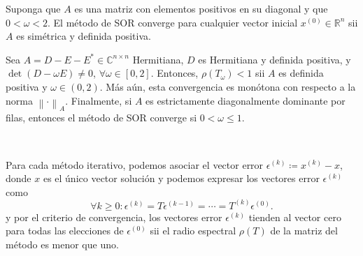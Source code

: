 \begin{frame}

	\begin{theorem}
		Suponga que $A$ es una matriz con elementos positivos en su
		diagonal y que $0<\omega<2$.
		El método de SOR converge para cualquier vector inicial
		$x^{\left(0\right)}\in\mathbb{R}^{n}$ sii $A$ es simétrica y
		definida positiva.
	\end{theorem}

	\begin{theorem}
		Sea $A=D-E-E^{\ast}\in\mathbb{C}^{n\times n}$ Hermitiana,
		$D$ es Hermitiana y definida positiva, y
		$\det\left(D-\omega E\right)\neq0$,
		$\forall\omega\in\left[0,2\right]$.
		Entonces, $\rho\left(T_{\omega}\right)<1$ sii $A$ es definida
		positiva y $\omega\in\left(0,2\right)$.
		Más aún, esta convergencia es monótona con respecto a la norma
		${\left\|\cdot\right\|}_{A}$.
		Finalmente, si $A$ es estrictamente diagonalmente dominante por
		filas, entonces el \alert{método de SOR} converge si
		$0<\omega\leq1$.
	\end{theorem}

	\

	Para cada método iterativo, podemos asociar el vector error
	\begin{math}
		\epsilon^{\left(k\right)}\coloneqq
		x^{\left(k\right)}-x
	\end{math},
	donde $x$ es el único vector solución y podemos expresar los
	vectores error $\epsilon^{\left(k\right)}$ como
	\begin{equation*}
		\forall k\geq0:
		\epsilon^{\left(k\right)}=
		T\epsilon^{\left(k-1\right)}=
		\cdots=
		T^{\left(k\right)}\epsilon^{\left(0\right)}.
	\end{equation*}
	y por el \alert{criterio de convergencia}, los vectores error
	$\epsilon^{\left(k\right)}$ tienden al vector cero para todas las
	elecciones de $\epsilon^{\left(0\right)}$ sii el radio espectral
	$\rho\left(T\right)$ de la matriz del método es menor que uno.
\end{frame}

